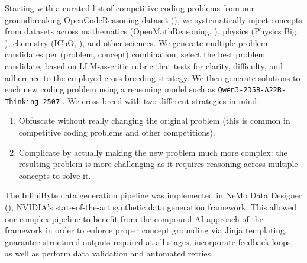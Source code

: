 Starting with a curated list of competitive coding problems from our groundbreaking OpenCodeReasoning dataset (\cite{ahmad2025opencodereasoning}), we systematically inject concepts from datasets across mathematics (OpenMathReasoning, \cite{moshkov2025aimo2}), physics (Physics Big, \cite{physics_big}), chemistry (IChO, \cite{icho_ipho}), and other sciences. We generate multiple problem candidates per (problem, concept) combination, select the best problem candidate, based on LLM-as-critic rubric that tests for clarity, difficulty, and adherence to the employed cross-breeding strategy. We then generate solutions to each new coding problem using a reasoning model such as \texttt{Qwen3-235B-A22B-Thinking-2507} \citep{yang2025qwen3technicalreport}. We cross-breed with two different strategies in mind:
\begin{enumerate}
    \item[1.] Obfuscate without really changing the original problem (this is common in competitive coding problems and other competitions).
    \item[2.] Complicate by actually making the new problem much more complex: the resulting problem is more challenging as it requires reasoning across multiple concepts to solve it. 
\end{enumerate}

The InfiniByte data generation pipeline was implemented in NeMo Data Designer (\cite{nemo-data-designer}), NVIDIA’s state-of-the-art synthetic data generation framework. This allowed our complex pipeline to benefit from the compound AI approach of the framework in order to enforce proper concept grounding via Jinja templating, guarantee structured outputs required at all stages, incorporate feedback loops, as well as perform data validation and automated retries. 

